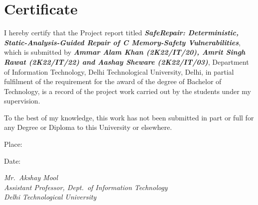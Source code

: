 \chapter*{Certificate}

I hereby certify that the Project report titled \textbf{\textit{SafeRepair: Deterministic, Static-Analysis-Guided Repair of C Memory-Safety Vulnerabilities}}, which is submitted by \textbf{\textit{Ammar Alam Khan (2K22\slash IT\slash 20), Amrit Singh Rawat (2K22\slash IT\slash 22) and Aashay Sheware (2K22\slash IT\slash 03)}}, Department of Information Technology, Delhi Technological University, Delhi, in partial fulfilment of the requirement for the award of the degree of Bachelor of Technology, is a record of the project work carried out by the students under my supervision.

\vspace{0.5cm}

To the best of my knowledge, this work has not been submitted in part or full for any Degree or Diploma to this University or elsewhere.

\vspace{1.5cm}

Place:

\vspace{0.6cm}

Date:

\vspace{2.5cm}

\begin{flushright}
\itshape
Mr.\ Akshay Mool \\
Assistant Professor, Dept.\ of Information Technology \\
Delhi Technological University
\end{flushright}
